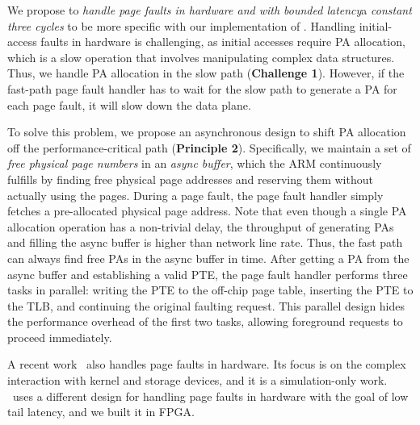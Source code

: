 We propose to {\em handle page faults in hardware and with bounded latency}\textemdash a {\em constant three cycles} to be more specific with our implementation of \sysboard.
Handling initial-access faults in hardware is challenging, as initial accesses require PA allocation, which is a slow operation that involves manipulating complex data structures.
Thus, we handle PA allocation in the slow path (\textbf{Challenge 1}).
However, if the fast-path page fault handler has to wait for the slow path to generate a PA for each page fault,
it will slow down the data plane.

To solve this problem, we propose an asynchronous design to shift PA allocation off the performance-critical path (\textbf{Principle 2}).
Specifically, we maintain a set of {\em free physical page numbers} in an {\em async buffer},
which the ARM continuously fulfills by finding free physical page addresses and reserving them without actually using the pages. %
During a page fault, the page fault handler simply fetches a pre-allocated physical page address. %
Note that even though a single PA allocation operation has a non-trivial delay, 
the throughput of generating PAs and filling the async buffer is higher than network line rate.
Thus, the fast path can always find free PAs in the async buffer in time.
After getting a PA from the async buffer and establishing a valid PTE, %
the page fault handler performs three tasks in parallel: 
writing the PTE to the off-chip page table, inserting the PTE to the TLB,
and continuing the original faulting request.
This parallel design hides the performance overhead of the first two tasks, allowing foreground requests to proceed immediately.

A recent work~\cite{lee-isca20} also handles page faults in hardware. 
Its focus is on the complex interaction with kernel and storage devices, and it is a simulation-only work. \sys\ uses a different design for handling page faults in hardware with the goal of low tail latency, and we built it in FPGA.

